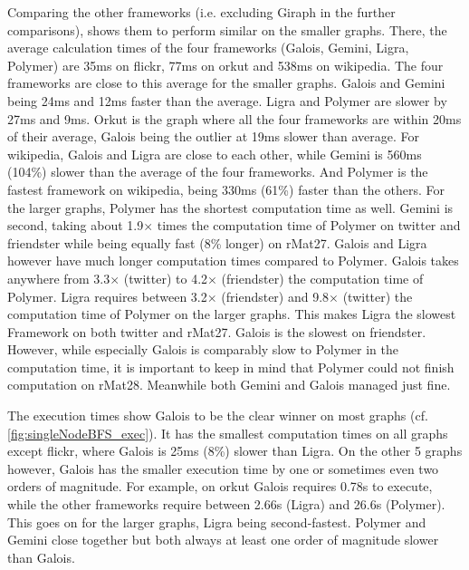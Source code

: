 Comparing the other frameworks (i.e. excluding Giraph in the further comparisons), shows them to perform similar on the smaller graphs. There, the average calculation times of the four frameworks (Galois, Gemini, Ligra, Polymer) are 35ms on flickr, 77ms on orkut and 538ms on wikipedia. 
The four frameworks are close to this average for the smaller graphs. Galois and Gemini being 24ms and 12ms faster than the average. Ligra and Polymer are slower by 27ms and 9ms.
Orkut is the graph where all the four frameworks are within 20ms of their average, Galois being the outlier at 19ms slower than average.
For wikipedia, Galois and Ligra are close to each other, while Gemini is 560ms (104\%) slower than the average of the four frameworks.
And Polymer is the fastest framework on wikipedia, being 330ms (61\%) faster than the others.
For the larger graphs, Polymer has the shortest computation time as well. Gemini is second, taking about 1.9$\times$ times the computation time of Polymer on twitter and friendster while being equally fast (8\% longer) on rMat27. Galois and Ligra however have much longer computation times compared to Polymer. Galois takes anywhere from 3.3$\times$ (twitter) to 4.2$\times$ (friendster) the computation time of Polymer.
Ligra requires between 3.2$\times$ (friendster) and 9.8$\times$ (twitter) the computation time of Polymer on the larger graphs. This makes Ligra the slowest Framework on both twitter and rMat27. Galois is the slowest on friendster.
However, while especially Galois is comparably slow to Polymer in the computation time, it is important to keep in mind that Polymer could not finish computation on rMat28. Meanwhile both Gemini and Galois managed just fine.

The execution times show Galois to be the clear winner on most graphs (cf. \autoref{fig:singleNodeBFS_exec}).
It has the smallest computation times on all graphs except flickr, where Galois is 25ms (8\%) slower than Ligra. 
On the other 5 graphs however, Galois has the smaller execution time by one or sometimes even two orders of magnitude. 
For example, on orkut Galois requires 0.78s to execute, while the other frameworks require between 2.66s (Ligra) and 26.6s (Polymer).
This goes on for the larger graphs, Ligra being second-fastest. Polymer and Gemini close together but both always at least one order of magnitude slower than Galois.

